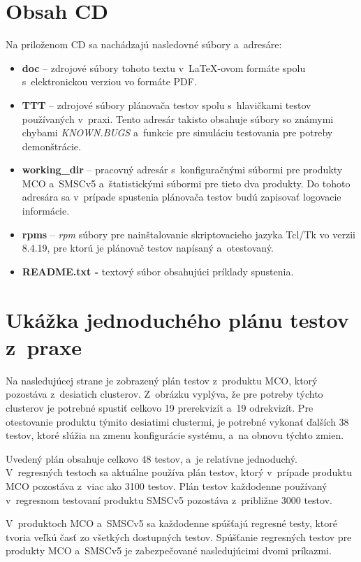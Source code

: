 %
%
\chapter{Obsah CD}
Na priloženom CD sa nachádzajú nasledovné súbory a~adresáre:
\begin{itemize}
\item \textbf{doc} -- zdrojové súbory tohoto textu v~\LaTeX-ovom formáte 
spolu s~elektronickou verziou vo formáte PDF.
\item \textbf{TTT} -- zdrojové súbory plánovača testov spolu s~hlavičkami 
testov používaných v~praxi. Tento adresár takisto obsahuje súbory 
so známymi chybami \textit{KNOWN.BUGS} a~funkcie pre simuláciu testovania
pre potreby demonštrácie.
\item \textbf{working\_dir} -- pracovný adresár s~konfiguračnými súbormi
pre produkty MCO a~SMSCv5 a~štatistickými súbormi pre tieto dva produkty.
Do tohoto adresára sa v~prípade spustenia plánovača testov budú zapisovať
logovacie informácie.
\item \textbf{rpms} -- \textit{rpm} súbory pre nainštalovanie 
skriptovacieho jazyka Tcl/Tk vo verzii 8.4.19, pre ktorú je plánovač 
testov napísaný a~otestovaný.
\item \textbf{README.txt -} textový súbor obsahujúci príklady spustenia.
\end{itemize}



%
%
\chapter{Ukážka jednoduchého plánu testov z~praxe}
\label{priloha:jednoduchy_plan_testov}
Na nasledujúcej strane je zobrazený plán testov z~produktu MCO,
ktorý pozostáva z~desiatich clusterov. Z~obrázku vyplýva, že pre potreby
týchto clusterov je potrebné spustiť celkovo 19 prerekvizít a~19 
odrekvizít. Pre otestovanie produktu týmito desiatimi clustermi, je 
potrebné vykonať ďalších 38 testov, ktoré slúžia na zmenu konfigurácie
systému, a~na obnovu týchto zmien. 

Uvedený plán obsahuje celkovo 48 testov, a~je relatívne jednoduchý.
V~regresných testoch sa aktuálne používa plán testov, ktorý v~prípade 
produktu MCO pozostáva z~viac ako 3100 testov.
Plán testov každodenne používaný v~regresnom testovaní produktu SMSCv5 
pozostáva z~približne 3000 testov.

V~produktoch MCO a~SMSCv5 sa každodenne spúšťajú regresné testy, ktoré
tvoria veľkú časť zo všetkých dostupných testov.
Spúšťanie regresných testov pre produkty MCO a~SMSCv5 je zabezpečované 
nasledujúcimi dvomi príkazmi.

